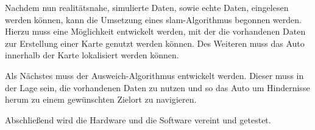 Nachdem nun realitätsnahe, simulierte Daten, sowie echte Daten, eingelesen werden können, kann die Umsetzung eines \acf{slam}-Algorithmus begonnen werden.
Hierzu muss eine Möglichkeit entwickelt werden, mit der die vorhandenen Daten zur Erstellung einer Karte genutzt werden können.
Des Weiteren muss das Auto innerhalb der Karte lokalisiert werden können.

Als Nächstes muss der Ausweich-Algorithmus entwickelt werden.
Dieser muss in der Lage sein, die vorhandenen Daten zu nutzen und so das Auto um Hindernisse herum zu einem gewünschten Zielort zu navigieren.

Abschließend wird die Hardware und die Software vereint und getestet.

\newpage
